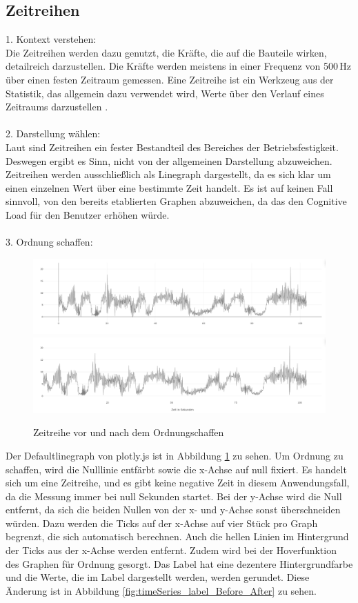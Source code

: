 \subsection{Zeitreihen}
\label{sec:timeseries}
1. Kontext verstehen: \\
Die Zeitreihen werden dazu genutzt, die Kräfte, die auf die Bauteile wirken, detailreich darzustellen. Die Kräfte werden meistens in einer Frequenz von 500\,Hz über einen festen Zeitraum gemessen. Eine Zeitreihe ist ein Werkzeug aus der Statistik, das allgemein dazu verwendet wird, Werte über den Verlauf eines Zeitraums darzustellen \cite{Billeter.1981}.
\\\\
2. Darstellung wählen:\\
Laut \cite{Gotz.2020} sind Zeitreihen ein fester Bestandteil des Bereiches der Betriebsfestigkeit. Deswegen ergibt es Sinn, nicht von der allgemeinen Darstellung abzuweichen. Zeitreihen werden ausschließlich als Linegraph dargestellt, da es sich klar um einen einzelnen Wert über eine bestimmte Zeit handelt. Es ist auf keinen Fall sinnvoll, von den bereits etablierten Graphen abzuweichen, da das den Cognitive Load für den Benutzer erhöhen würde.
\\\\
3. Ordnung schaffen:\\
\begin{figure}[h!]
\centering
\includegraphics[width=\textwidth]{gfx/Zeitreihe_before.png} 
\includegraphics[width=\textwidth]{gfx/Zeitreihe_after.png}
\caption{Zeitreihe vor und nach dem Ordnungschaffen}
\label{fig:timeSeries_Before_After}
\end{figure}
\noindent
Der Defaultlinegraph von plotly.js ist in Abbildung \ref{fig:timeSeries_Before_After} zu sehen. Um Ordnung zu schaffen, wird die Nulllinie entfärbt sowie die x-Achse auf null fixiert. Es handelt sich um eine Zeitreihe, und es gibt keine negative Zeit in diesem Anwendungsfall, da die Messung immer bei null Sekunden startet. Bei der y-Achse wird die Null entfernt, da sich die beiden Nullen von der x- und y-Achse sonst überschneiden würden. Dazu werden die Ticks auf der x-Achse auf vier Stück pro Graph begrenzt, die sich automatisch berechnen. Auch die hellen Linien im Hintergrund der Ticks aus der x-Achse werden entfernt. Zudem wird bei der Hoverfunktion des Graphen für Ordnung gesorgt. Das Label hat eine dezentere Hintergrundfarbe und die Werte, die im Label dargestellt werden, werden gerundet. Diese Änderung ist in Abbildung \ref{fig:timeSeries_label_Before_After} zu sehen. 
